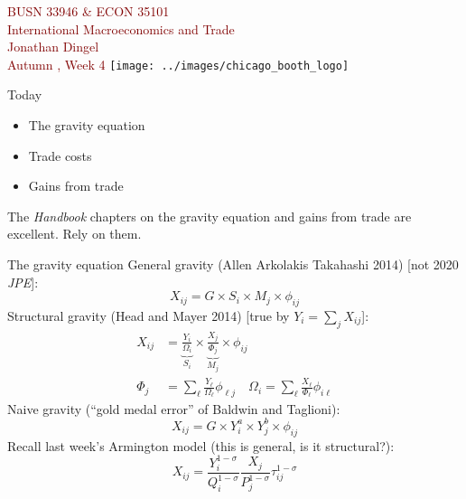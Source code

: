 \documentclass[10pt,notes=hide]{beamer}
\begin{document}
\begin{frame}[plain]
\begin{center}
\large
\textcolor{maroon}{BUSN 33946 \& ECON 35101\\
International Macroeconomics and Trade\\ 
Jonathan Dingel\\
Autumn \the\year, Week 4}
\vfill 
\texttt{[image: ../images/chicago\_booth\_logo]}
\end{center}
\end{frame}
\begin{frame}{Today}
\begin{itemize}
	\item The gravity equation
	\item Trade costs
	\item Gains from trade
\end{itemize}
The \textit{Handbook} chapters on the gravity equation and gains from trade are excellent.
Rely on them.
\end{frame}
\begin{frame}{The gravity equation}
General gravity (Allen Arkolakis Takahashi 2014) [not 2020 \textit{JPE}]:
\begin{equation*}
X_{ij} = G \times S_i \times M_j \times \phi_{ij}
\end{equation*}
Structural gravity (Head and Mayer 2014) [true by $Y_i = \sum_j X_{ij}$]:
\begin{align*}
X_{ij} &= \underbrace{\frac{Y_i}{\Omega_i}}_{S_i} \times \underbrace{\frac{X_j}{\Phi_j}}_{M_j} \times \phi_{ij}\\
\Phi_j  &= \sum_{\ell} \frac{Y_{\ell}}{\Omega_{\ell}} \phi_{\ell j}
\quad \Omega_i = \sum_{\ell} \frac{X_{\ell}}{\Phi_{\ell}} \phi_{i \ell}
\end{align*}
Naive gravity (``gold medal error'' of Baldwin and Taglioni):
\begin{equation*}
X_{ij} = G \times Y_i^a \times Y_j^b \times \phi_{ij}
\end{equation*}
Recall last week's Armington model (this is general, is it structural?):
\begin{equation*}
X_{ij}	= \frac{Y_i^{1-\sigma}}{Q_i^{1-\sigma}} \frac{X_j}{P_j^{1-\sigma}}\tau_{ij}^{1-\sigma}
\end{equation*}
\end{frame}
\end{document}
